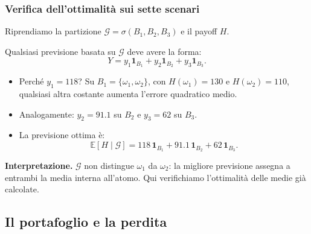 \documentclass[handout]{beamer}%
\newenvironment{stepitemize}{\begin{itemize}[<+->]}{\end{itemize} }
\providecommand{\E}{\mathbb{E}}
\providecommand{\G}{\mathcal{G}}
\providecommand{\1}{\mathbf{1}}
\providecommand{\QTR}[2]{\csname #1\endcsname{#2}}
\begin{document}
\begin{frame}%
%

\frametitle{Verifica dell'ottimalit\`{a} sui sette scenari}%
%

%


Riprendiamo la partizione $\G = \sigma(B_{1}, B_{2}, B_{3})$ e il payoff $H$.

\medskip

Qualsiasi previsione basata su $\G$ deve avere la forma:
\[
Y = y_{1} \1_{B_{1}} + y_{2} \1_{B_{2}} + y_{3} \1_{B_{3}}.
\]


\begin{stepitemize}
\item Perch\'{e} $y_{1} = 118$? Su $B_{1} = \{\omega_{1}, \omega_{2}\}$, con
$H(\omega_{1}) = 130$ e $H(\omega_{2}) = 110$, qualsiasi altra costante
aumenta l'errore quadratico medio.

\item Analogamente: $y_{2} = 91.1$ su $B_{2}$ e $y_{3} = 62$ su $B_{3}$.

\item La previsione ottima \`{e}:
\[
\E[H\mid\G] = 118\,\1_{B_{1}} + 91.1\,\1_{B_{2}} + 62\,\1_{B_{3}}.
\]

\end{stepitemize}

\medskip

\textbf{Interpretazione.} $\G$ non distingue $\omega_{1}$ da $\omega_{2}$: la
migliore previsione assegna a entrambi la media interna all'atomo. \textcolor{light-blue}{Qui verifichiamo l'ottimalit\`{a} delle medie gi\`{a} calcolate.}%

\transboxout
\end{frame}%


\subsection{Il portafoglio e la perdita}%
\end{document}
